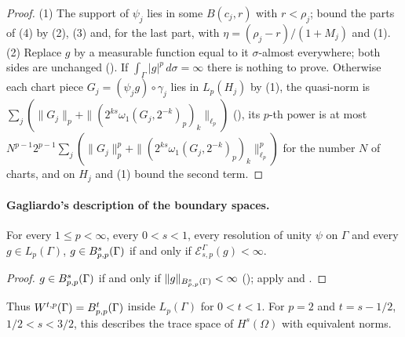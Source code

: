 \begin{proof}
\leanok
(1) The support of $\psi_j$ lies in some $B(c_j, r)$ with $r < \rho_j$; bound the parts of
 (4) by (2), (3) and, for the last part,
 with $\eta = (\rho_j - r)/(1 + M_j)$ and (1). (2) Replace
$g$ by a measurable function equal to it $\sigma$-almost everywhere; both sides are unchanged
(). If $\int_\Gamma |g|^p \, d\sigma = \infty$ there is
nothing to prove. Otherwise each chart piece $G_j = (\psi_j g) \circ \gamma_j$ lies in $L_p(H_j)$
by  (1), the quasi-norm is
$\sum_j (\|G_j\|_p + \|(2^{ks} \omega_1(G_j, 2^{-k})_p)_k\|_{\ell_p})$
(), its $p$-th power is at most
$N^{p-1} 2^{p-1} \sum_j (\|G_j\|_p^p + \|(2^{ks} \omega_1(G_j, 2^{-k})_p)_k\|_{\ell_p}^p)$ for the
number $N$ of charts, and  on $H_j$ and (1) bound the second
term.
\end{proof}

\paragraph{Gagliardo's description of the boundary spaces.}

\begin{theorem}
\label{thm:boundary-slobodeckij-besov}
\leanok
{}
For every $1 \leq p < \infty$, every $0 < s < 1$, every resolution of unity $\psi$ on $\Gamma$ and
every $g \in L_p(\Gamma)$, $g \in B^{s}_{p,p}(\Gamma)$ if and only if
$\mathcal{E}^\Gamma_{s,p}(g) < \infty$.
\end{theorem}

\begin{proof}
\leanok
$g \in B^{s}_{p,p}(\Gamma)$ if and only if $\|g\|_{B^{s}_{p,p}(\Gamma)} < \infty$
(); apply  and
.
\end{proof}

Thus $W^{t,p}(\Gamma) = B^{t}_{p,p}(\Gamma)$ inside $L_p(\Gamma)$ for $0 < t < 1$. For
$p = 2$ and $t = s - 1/2$, $1/2 < s < 3/2$, this describes the trace space of $H^s(\Omega)$ with
equivalent norms.

